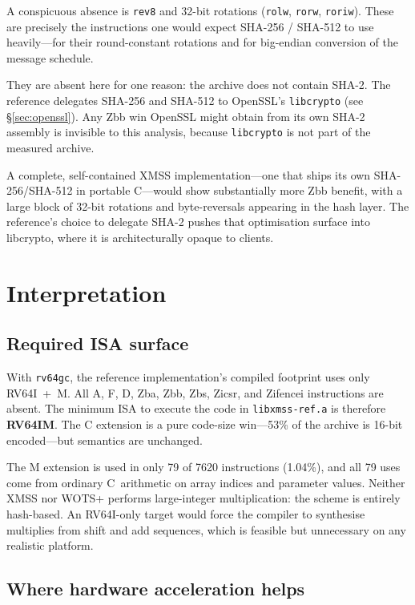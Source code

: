 \documentclass[11pt,a4paper]{article}
\begin{document}
A conspicuous absence is \texttt{rev8} and 32-bit rotations
(\texttt{rolw}, \texttt{rorw}, \texttt{roriw}).  These are precisely
the instructions one would expect SHA-256 / SHA-512 to use
heavily---for their round-constant rotations and for big-endian
conversion of the message schedule.

They are absent here for one reason: the archive does not contain
SHA-2.  The reference delegates SHA-256 and SHA-512 to OpenSSL's
\texttt{libcrypto} (see \S\ref{sec:openssl}).  Any Zbb win
OpenSSL might obtain from its own SHA-2 assembly is invisible to this
analysis, because \texttt{libcrypto} is not part of the measured
archive.

A complete, self-contained XMSS implementation---one that ships its
own SHA-256/SHA-512 in portable C---would show substantially more
Zbb benefit, with a large block of 32-bit rotations and byte-reversals
appearing in the hash layer.  The reference's choice to delegate SHA-2
pushes that optimisation surface into libcrypto, where it is
architecturally opaque to clients.

\section{Interpretation}

\subsection{Required ISA surface}

With \texttt{rv64gc}, the reference implementation's compiled footprint
uses only RV64I~+~M.  All A, F, D, Zba, Zbb, Zbs, Zicsr, and Zifencei
instructions are absent.  The minimum ISA to execute the code in
\texttt{libxmss-ref.a} is therefore \textbf{RV64IM}.  The C extension
is a pure code-size win---53\% of the archive is 16-bit encoded---but
semantics are unchanged.

The M extension is used in only 79 of 7620 instructions (1.04\%), and
all 79 uses come from ordinary C~arithmetic on array indices and
parameter values.  Neither XMSS nor WOTS+ performs large-integer
multiplication: the scheme is entirely hash-based.  An RV64I-only
target would force the compiler to synthesise multiplies from shift
and add sequences, which is feasible but unnecessary on any realistic
platform.

\subsection{Where hardware acceleration helps}
\end{document}
